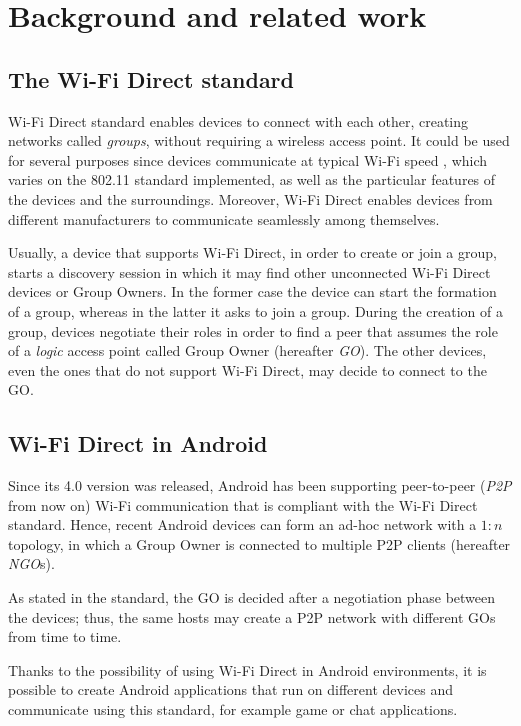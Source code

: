 \section{Background and related work}
\subsection{The Wi-Fi Direct standard}
Wi-Fi Direct standard enables devices to connect with each other, creating 
networks called \textit{groups}, without requiring a wireless access point. It
could be used for several purposes since devices communicate at typical Wi-Fi
speed \cite{bib:wifiP2pspec}, which varies on the 802.11 standard implemented,
as well as the particular features of the devices and the surroundings.
Moreover, Wi-Fi Direct enables devices from different manufacturers to
communicate seamlessly among themselves.

Usually, a device that supports Wi-Fi Direct, in order to create or join a
group, starts a discovery session in which it may find other unconnected Wi-Fi
Direct devices or Group Owners.
In the former case the device can start the formation of a group, whereas in
the latter it asks to join a group.
During the creation of a group,
devices negotiate their roles in order to find a peer that assumes the role of
a \emph{logic} access point called Group Owner (hereafter \textit{GO}). The
other devices, even the ones that do not support Wi-Fi Direct, may decide to
connect to the GO.

\subsection{Wi-Fi Direct in Android}
Since its 4.0 version was released, Android has been supporting peer-to-peer 
(\textit{P2P} from now on) Wi-Fi communication that is compliant with the 
Wi-Fi Direct standard\cite{bib:wifiP2pspec}. 
Hence, recent Android devices can form an ad-hoc network with a $1:n$ topology,
in which a Group Owner is connected to multiple P2P clients (hereafter \textit{NGO}s).

As stated in the standard, the GO is decided after a negotiation phase between
the devices; thus, the same hosts may create a P2P network with different GOs
from time to time.

Thanks to the possibility of using Wi-Fi Direct in Android environments, it is
possible to create Android applications that run on different devices and
communicate using this standard, for example game or chat applications.

